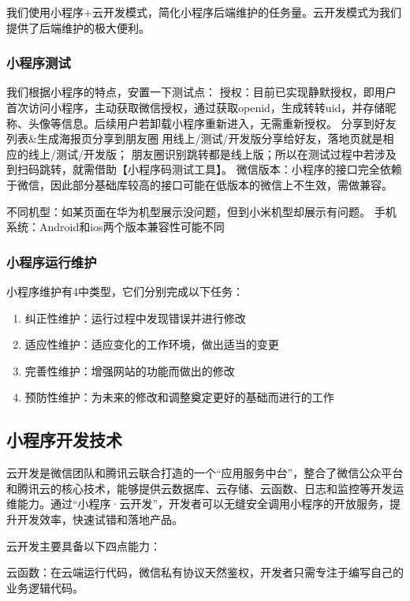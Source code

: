 \documentclass[UTF8,12pt]{ctexart}
\numberwithin{figure}{section}%
\begin{document}
\begin{spacing}{2}
我们使用小程序+云开发模式，简化小程序后端维护的任务量。云开发模式为我们提供了后端维护的极大便利。

\subsubsection{小程序测试}
我们根据小程序的特点，安置一下测试点：
授权：目前已实现静默授权，即用户首次访问小程序，主动获取微信授权，通过获取openid，生成转转uid，并存储昵称、头像等信息。后续用户若卸载小程序重新进入，无需重新授权。
分享到好友列表\&生成海报页分享到朋友圈
用线上/测试/开发版分享给好友，落地页就是相应的线上/测试/开发版；
朋友圈识别跳转都是线上版；所以在测试过程中若涉及到扫码跳转，就需借助【小程序码测试工具】。
微信版本：小程序的接口完全依赖于微信，因此部分基础库较高的接口可能在低版本的微信上不生效，需做兼容。

不同机型：如某页面在华为机型展示没问题，但到小米机型却展示有问题。
手机系统：Android和ios两个版本兼容性可能不同

\subsubsection{小程序运行维护}
小程序维护有4中类型，它们分别完成以下任务：
\begin{enumerate}
	\item[(1)]纠正性维护：运行过程中发现错误并进行修改
	
	\item[(2)]适应性维护：适应变化的工作环境，做出适当的变更
	
	\item[(3)]完善性维护：增强网站的功能而做出的修改
	
	\item[(4)]预防性维护：为未来的修改和调整奠定更好的基础而进行的工作
	
\end{enumerate}

\subsection{小程序开发技术}

云开发是微信团队和腾讯云联合打造的一个“应用服务中台”，整合了微信公众平台和腾讯云的核心技术，能够提供云数据库、云存储、云函数、日志和监控等开发运维能力。通过“小程序·云开发”，开发者可以无缝安全调用小程序的开放服务，提升开发效率，快速试错和落地产品。

云开发主要具备以下四点能力：

云函数：在云端运行代码，微信私有协议天然鉴权，开发者只需专注于编写自己的业务逻辑代码。


\end{spacing}
\end{document}
